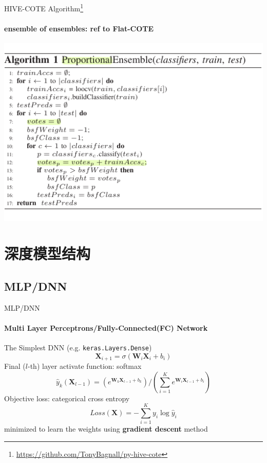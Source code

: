 \documentclass[aspectratio=169]{ctexbeamer}
\begin{document}
\begin{frame}{HIVE-COTE Algorithm\footnote{\url{https://github.com/TonyBagnall/py-hive-cote}}}
	\framesubtitle{ensemble of ensembles: ref to Flat-COTE}
	\begin{center}
		\includegraphics[width=.7\textwidth]{figure/flat_cote_algo}
	\end{center}

\end{frame}


\section{深度模型结构}

\subsection{MLP/DNN}
\begin{frame}{MLP/DNN}
	\framesubtitle{Multi Layer Perceptrons/Fully-Connected(FC) Network}
	The Simplest DNN (e.g. \texttt{keras.Layers.Dense})
	$$\mathbf{X}_{i+1} = \sigma (\mathbf{W}_i \mathbf{X}_i + b_i)$$
	Final ($l$-th) layer activate function: softmax
	$$\hat {y} _{k} (\mathbf{X}_{l-1}) = (e^{\mathbf{W}_k \mathbf{X}_{l-1} + b_k}) /
	(\sum_{i=1}^{K} {e^{\mathbf{W}_i \mathbf{X}_{l-1} + b_i}})$$
	Objective loss:  categorical cross entropy
	$$Loss(\textbf{X}) = - \sum_{i=1}^{K}{y_i} \log {\hat y}_i$$
	minimized to learn the weights using \textbf{gradient descent} method
\end{frame}
\end{document}
